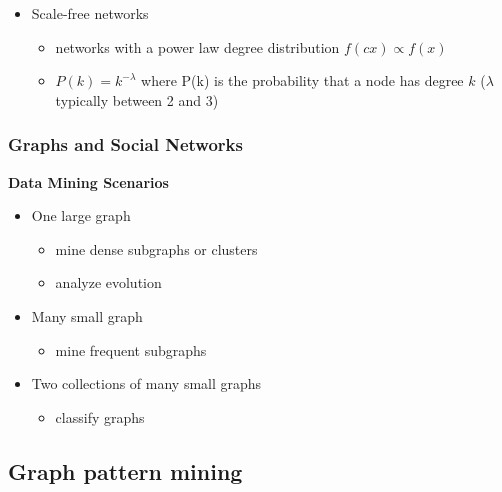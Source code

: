 \documentclass[../notes.tex]{subfiles}
\begin{document}
\begin{itemize}
  \item Scale-free networks
  \begin{itemize}
    \item networks with a power law degree distribution $f(cx) \propto f(x)$
    \item $P(k) = k^{-\lambda}$ where P(k) is the probability that a node has degree $k$ ($\lambda$ typically between 2 and 3)
  \end{itemize}
\end{itemize}

\newpage

\subsubsection{Graphs and Social Networks}
\textbf{Data Mining Scenarios}
\begin{itemize}
  \item One large graph
  \begin{itemize}
    \item mine dense subgraphs or clusters
    \item analyze evolution
  \end{itemize}

  \item Many small graph
  \begin{itemize}
    \item mine frequent subgraphs
  \end{itemize}

  \item Two collections of many small graphs
  \begin{itemize}
    \item classify graphs
  \end{itemize}

\end{itemize}

\subsection{Graph pattern mining}
\end{document}
